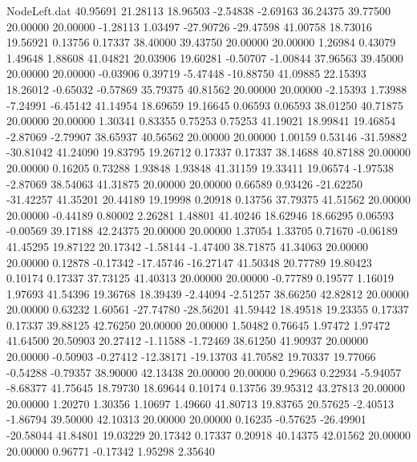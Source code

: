 \begin{filecontents}{NodeLeft.dat}
  40.95691   21.28113   18.96503    -2.54838   -2.69163   36.24375   39.77500   20.00000   20.00000   -1.28113    1.03497  -27.90726  -29.47598
  41.00758   18.73016   19.56921     0.13756    0.17337   38.40000   39.43750   20.00000   20.00000    1.26984    0.43079    1.49648    1.88608
  41.04821   20.03906   19.60281    -0.50707   -1.00844   37.96563   39.45000   20.00000   20.00000   -0.03906    0.39719   -5.47448  -10.88750
  41.09885   22.15393   18.26012    -0.65032   -0.57869   35.79375   40.81562   20.00000   20.00000   -2.15393    1.73988   -7.24991   -6.45142
  41.14954   18.69659   19.16645     0.06593    0.06593   38.01250   40.71875   20.00000   20.00000    1.30341    0.83355    0.75253    0.75253
  41.19021   18.99841   19.46854    -2.87069   -2.79907   38.65937   40.56562   20.00000   20.00000    1.00159    0.53146  -31.59882  -30.81042
  41.24090   19.83795   19.26712     0.17337    0.17337   38.14688   40.87188   20.00000   20.00000    0.16205    0.73288    1.93848    1.93848
  41.31159   19.33411   19.06574    -1.97538   -2.87069   38.54063   41.31875   20.00000   20.00000    0.66589    0.93426  -21.62250  -31.42257
  41.35201   20.44189   19.19998     0.20918    0.13756   37.79375   41.51562   20.00000   20.00000   -0.44189    0.80002    2.26281    1.48801
  41.40246   18.62946   18.66295     0.06593   -0.00569   39.17188   42.24375   20.00000   20.00000    1.37054    1.33705    0.71670   -0.06189
  41.45295   19.87122   20.17342    -1.58144   -1.47400   38.71875   41.34063   20.00000   20.00000    0.12878   -0.17342  -17.45746  -16.27147
  41.50348   20.77789   19.80423     0.10174    0.17337   37.73125   41.40313   20.00000   20.00000   -0.77789    0.19577    1.16019    1.97693
  41.54396   19.36768   18.39439    -2.44094   -2.51257   38.66250   42.82812   20.00000   20.00000    0.63232    1.60561  -27.74780  -28.56201
  41.59442   18.49518   19.23355     0.17337    0.17337   39.88125   42.76250   20.00000   20.00000    1.50482    0.76645    1.97472    1.97472
  41.64500   20.50903   20.27412    -1.11588   -1.72469   38.61250   41.90937   20.00000   20.00000   -0.50903   -0.27412  -12.38171  -19.13703
  41.70582   19.70337   19.77066    -0.54288   -0.79357   38.90000   42.13438   20.00000   20.00000    0.29663    0.22934   -5.94057   -8.68377
  41.75645   18.79730   18.69644     0.10174    0.13756   39.95312   43.27813   20.00000   20.00000    1.20270    1.30356    1.10697    1.49660
  41.80713   19.83765   20.57625    -2.40513   -1.86794   39.50000   42.10313   20.00000   20.00000    0.16235   -0.57625  -26.49901  -20.58044
  41.84801   19.03229   20.17342     0.17337    0.20918   40.14375   42.01562   20.00000   20.00000    0.96771   -0.17342    1.95298    2.35640

\end{filecontents}
